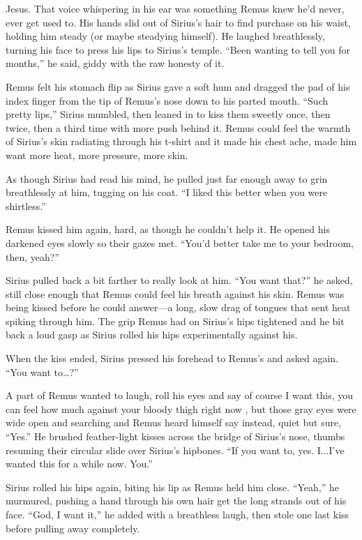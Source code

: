 Jesus. That voice whispering in his ear was something Remus knew he’d never, ever get used to. His hands slid out of Sirius’s hair to find purchase on his waist, holding him steady (or maybe steadying himself). He laughed breathlessly, turning his face to press his lips to Sirius’s temple. “Been wanting to tell you for months,” he said, giddy with the raw honesty of it.

Remus felt his stomach flip as Sirius gave a soft hum and dragged the pad of his index finger from the tip of Remus’s nose down to his parted mouth. “Such pretty lips,” Sirius mumbled, then leaned in to kiss them sweetly once, then twice, then a third time with more push behind it. Remus could feel the warmth of Sirius’s skin radiating through his t-shirt and it made his chest ache, made him want more heat, more pressure, more skin.

As though Sirius had read his mind, he pulled just far enough away to grin breathlessly at him, tugging on his coat. “I liked this better when you were shirtless.”

Remus kissed him again, hard, as though he couldn’t help it. He opened his darkened eyes slowly so their gazes met. “You’d better take me to your bedroom, then, yeah?”

Sirius pulled back a bit farther to really look at him. “You want that?” he asked, still close enough that Remus could feel his breath against his skin. Remus was being kissed before he could answer—a long, slow drag of tongues that sent heat spiking through him. The grip Remus had on Sirius’s hips tightened and he bit back a loud gasp as Sirius rolled his hips experimentally against his.

When the kiss ended, Sirius pressed his forehead to Remus’s and asked again. “You want to…?”

A part of Remus wanted to laugh, roll his eyes and say of course I want this, you can feel how much against your bloody thigh right now , but those gray eyes were wide open and searching and Remus heard himself say instead, quiet but sure, “Yes.” He brushed feather-light kisses across the bridge of Sirius’s nose, thumbs resuming their circular slide over Sirius's hipbones. “If you want to, yes. I...I’ve wanted this for a while now. You.”

Sirius rolled his hips again, biting his lip as Remus held him close. “Yeah,” he murmured, pushing a hand through his own hair get the long strands out of his face. “God, I want it,” he added with a breathless laugh, then stole one last kiss before pulling away completely.

